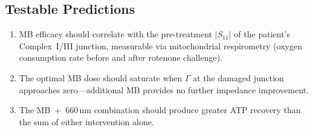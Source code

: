 \subsection{Testable Predictions}

\begin{enumerate}
  \item MB efficacy should correlate with the pre-treatment
        $|S_{11}|$ of the patient's Complex~I/III junction,
        measurable via mitochondrial respirometry (oxygen
        consumption rate before and after rotenone challenge).
  \item The optimal MB dose should saturate when $\Gamma$ at the
        damaged junction approaches zero---additional MB provides
        no further impedance improvement.
  \item The MB~+~660\,nm combination should produce greater ATP
        recovery than the sum of either intervention alone.
\end{enumerate}
